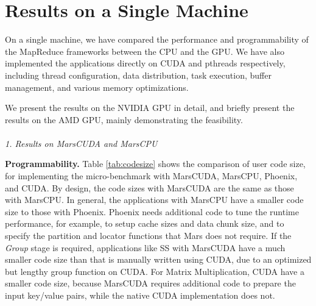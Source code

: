 \section{Results on a Single Machine}
On a single machine, we have compared the performance and
programmability of the MapReduce frameworks between the CPU and the
GPU. 
We have also implemented the applications directly on CUDA and pthreads respectively,
including thread configuration, data distribution, task execution,  buffer management, and various memory optimizations.

We present the results on the NVIDIA GPU in detail, and briefly
present the results on the AMD GPU, mainly demonstrating the
feasibility.
\\\\
{\em 1. Results on MarsCUDA and MarsCPU}

{\bf Programmability.} Table \ref{tab:codesize} shows the comparison
of user code size, for implementing the micro-benchmark
with MarsCUDA, MarsCPU, Phoenix, and CUDA. By design, the code sizes
with MarsCUDA are the same as those with MarsCPU. In general, the
applications with MarsCPU have a smaller code size to those with
Phoenix. Phoenix needs additional code to tune the runtime performance, for example, to setup cache sizes and data chunk size, and to specify the partition and locator functions that Mars does not require. 
If the {\em Group} stage is required, applications like
SS with MarsCUDA have a much smaller code size than that
is manually written using CUDA, due to an optimized but lengthy
group function on CUDA.  
For Matrix Multiplication, CUDA have a smaller code size, because MarsCUDA requires additional code to prepare the input key/value pairs, while the native CUDA implementation does not. 

\doublerulesep 0.1pt
\begin{table}[htb]
  \centering
\end{table}

